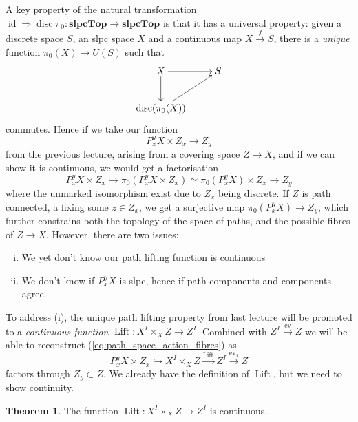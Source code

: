 \documentclass{tufte-handout}
\def\into {\hookrightarrow}
\def\slpcTop {\mathbf{slpcTop}}
\DeclareMathOperator{\disc}{disc}
\DeclareMathOperator{\id}{id}
\DeclareMathOperator{\ev}{ev}
\DeclareMathOperator{\Lift}{Lift}
\theoremstyle{definition}
\newtheorem{theorem}{Theorem}
\begin{document}
A key property of the natural transformation $\id \Rightarrow \disc\pi_0\colon \slpcTop\to\slpcTop$
is that it has a universal property: given a discrete space $S$, an slpc space $X$ and a continuous
map $X\xrightarrow{f} S$, there is a \emph{unique} function $\pi_0(X)\to U(S)$ such that
\[
\xymatrix{
X \ar[r] \ar[d] & S\\
\disc(\pi_0(X)) \ar[ur]
}
\]
commutes. Hence if we take our function 
\begin{equation}\label{eq:path_space_action_fibres}
P_x^yX \times Z_x \to Z_y
\end{equation}
from the previous lecture, 
arising from a covering space $Z\to X$, and if we can show it is continuous, we would get a 
factorisation
\[
P_x^y X\times Z_x\to \pi_0(P_x^y X\times Z_x) \simeq \pi_0(P_x^yX)\times Z_x \to Z_y
\]
where the unmarked isomorphism exist due to $Z_x$ being discrete.
If $Z$ is path connected, a fixing some $z\in Z_x$, we get a surjective map $\pi_0(P_x^y X)\to Z_y$,
which further constrains both the topology of the space of paths, and the possible fibres of 
$Z\to X$. However, there are two issues:
\begin{enumerate}[(i)]
\item We yet don't know our path lifting function is continuous
\item We don't know if $P_x^y X$ is slpc, hence if path components and components agree.
\end{enumerate}

To address (i), the unique path lifting property from last lecture will be promoted to a
\emph{continuous function} $\Lift\colon X^I\times_X Z \to Z^I$. Combined with $Z^I \xrightarrow{\ev} Z$
we will be able to reconstruct (\ref{eq:path_space_action_fibres}) as
\[
P_x^y X \times Z_x \into X^I \times_X Z \xrightarrow{\Lift} Z^I \xrightarrow{\ev_1} Z
\]
factors through $Z_y \subset Z$. We already have the definition of $\Lift$, but we need to show 
continuity.

\begin{theorem}
The function $\Lift\colon X^I\times_X Z \to Z^I$ is continuous.
\end{theorem}
\end{document}
